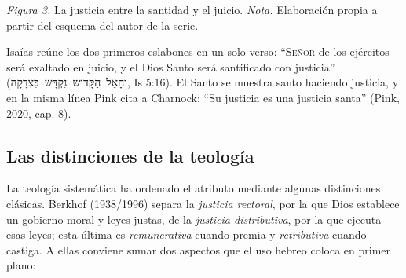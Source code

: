 \documentclass[11pt,letterpaper]{article}
\newcommand{\heb}[1]{\mbox{\foreignlanguage{hebrew}{#1}}}
\newcommand{\SENOR}{\textsc{Señor}}
\begin{document}
\begin{center}
\par
{\footnotesize\color{gris}\textit{Figura 3.} La justicia entre la santidad y el juicio. \textit{Nota.} Elaboración propia a partir del esquema del autor de la serie.}
\end{center}

Isaías reúne los dos primeros eslabones en un solo verso: ``\SENOR{} de los ejércitos será exaltado en juicio, y el Dios Santo será santificado con justicia'' (\heb{וְהָאֵל הַקָּדוֹשׁ נִקְדָּשׁ בִּצְדָקָה}, Is 5:16). El Santo se muestra santo haciendo justicia, y en la misma línea Pink cita a Charnock: ``Su justicia es una justicia santa'' (Pink, 2020, cap. 8).

\subsection{Las distinciones de la teología}
La teología sistemática ha ordenado el atributo mediante algunas distinciones clásicas. Berkhof (1938/1996) separa la \emph{justicia rectoral}, por la que Dios establece un gobierno moral y leyes justas, de la \emph{justicia distributiva}, por la que ejecuta esas leyes; esta última es \emph{remunerativa} cuando premia y \emph{retributiva} cuando castiga. A ellas conviene sumar dos aspectos que el uso hebreo coloca en primer plano:
\end{document}
